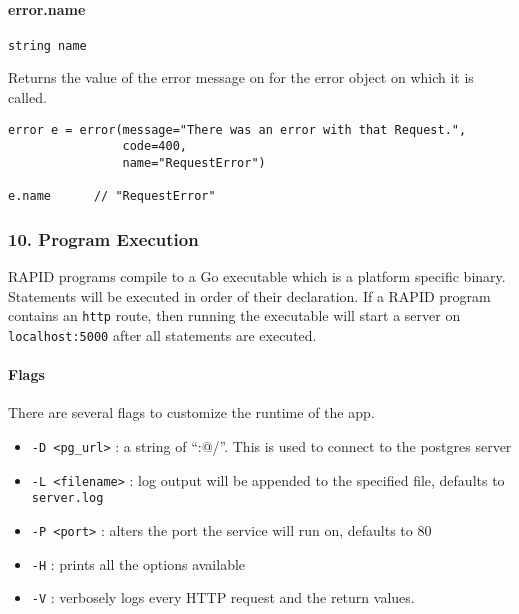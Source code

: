 \paragraph{error.name}\label{error.name}

\begin{verbatim}
string name
\end{verbatim}

Returns the value of the error message on for the error object on which
it is called.

\begin{verbatim}
error e = error(message="There was an error with that Request.",
                code=400,
                name="RequestError")

e.name      // "RequestError"
\end{verbatim}

\subsubsection{10. Program Execution}\label{program-execution}

RAPID programs compile to a Go executable which is a platform specific
binary. Statements will be executed in order of their declaration. If a
RAPID program contains an \texttt{http} route, then running the
executable will start a server on \texttt{localhost:5000} after all
statements are executed.

\paragraph{Flags}\label{flags}

There are several flags to customize the runtime of the app.

\begin{itemize}
\itemsep1pt\parskip0pt
\item
  \texttt{-D \textless{}pg\_url\textgreater{}} : a string of ``:@/''.
  This is used to connect to the postgres server
\item
  \texttt{-L \textless{}filename\textgreater{}} : log output will be
  appended to the specified file, defaults to \texttt{server.log}
\item
  \texttt{-P \textless{}port\textgreater{}} : alters the port the
  service will run on, defaults to 80
\item
  \texttt{-H} : prints all the options available
\item
  \texttt{-V} : verbosely logs every HTTP request and the return values.
\end{itemize}

